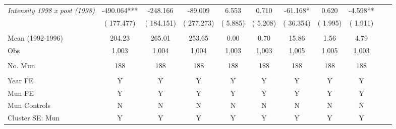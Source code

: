 \begin{tabular}{lcccccccccc}
\textit{Intensity 1998 x post (1998)} &     -490.064***  &     -248.166 &      -89.009 &        6.553 &        0.710 &      -61.168* &        0.620 &       -4.598**\\  
& (     177.477)  & (     184.151) & (     277.273) & (       5.885) & (       5.208)  & (      36.354) & (       1.995) & (       1.911)\\ 
  & & &  & & & & & \\ 
Mean (1992-1996) &       204.23  &       265.01 &       253.65 &         0.00 &         0.70 &        15.86&         1.56 &         4.79  \\  
Obs &        1,003  &        1,004 &        1,004 &        1,003 &        1,003 &        1,005 &        1,005 &        1,003 \\ 
  & & &  & & & & & \\ 
No. Mun &          188  &          188 &          188 &          188 &          188 &          188 &          188 &          188 \\  
&  &  &  & &  &  &  & & &          \\  
Year FE & Y & Y & Y & Y & Y & Y & Y & Y \\ 
Mun FE & Y & Y & Y & Y & Y & Y & Y & Y\\ 
Mun Controls & N  & N & N & N & N  & N & N & N    \\  
Cluster SE: Mun & Y & Y & Y & Y & Y & Y & Y & Y \\ 
\bottomrule
\end{tabular}